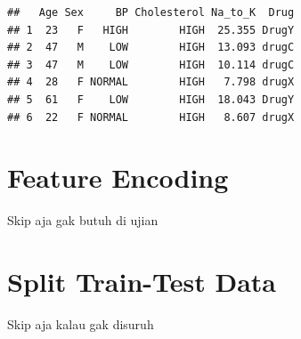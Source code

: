 \documentclass[
]{article}
\newenvironment{Shaded}{\begin{snugshade}}{\end{snugshade}}
\newcommand{\DecValTok}[1]{\textcolor[rgb]{0.00,0.00,0.81}{#1}}
\newcommand{\FunctionTok}[1]{\textcolor[rgb]{0.13,0.29,0.53}{\textbf{#1}}}
\newcommand{\NormalTok}[1]{#1}
\newcommand{\OtherTok}[1]{\textcolor[rgb]{0.56,0.35,0.01}{#1}}
\newcommand{\SpecialCharTok}[1]{\textcolor[rgb]{0.81,0.36,0.00}{\textbf{#1}}}
\newcommand{\StringTok}[1]{\textcolor[rgb]{0.31,0.60,0.02}{#1}}
\begin{document}
\begin{verbatim}
##   Age Sex     BP Cholesterol Na_to_K  Drug
## 1  23   F   HIGH        HIGH  25.355 DrugY
## 2  47   M    LOW        HIGH  13.093 drugC
## 3  47   M    LOW        HIGH  10.114 drugC
## 4  28   F NORMAL        HIGH   7.798 drugX
## 5  61   F    LOW        HIGH  18.043 DrugY
## 6  22   F NORMAL        HIGH   8.607 drugX
\end{verbatim}

\section{Feature Encoding}\label{feature-encoding}

Skip aja gak butuh di ujian

\begin{Shaded}
\end{Shaded}

\section{Split Train-Test Data}\label{split-train-test-data}

Skip aja kalau gak disuruh
\end{document}
